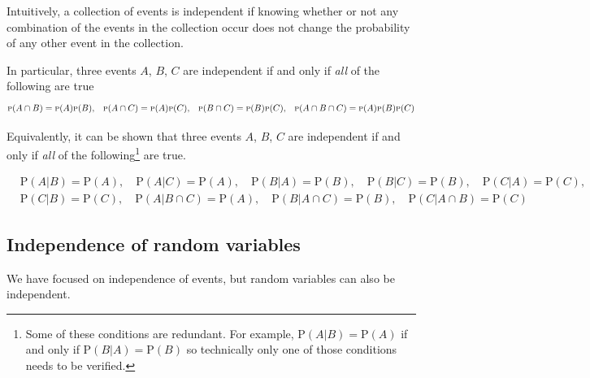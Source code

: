 \documentclass[
  letterpaper,
  DIV=11,
  numbers=noendperiod]{scrreprt}
\theoremstyle{plain}
\theoremstyle{definition}
\theoremstyle{definition}
\theoremstyle{definition}
\theoremstyle{remark}
\begin{document}
Intuitively, a collection of events is independent if knowing whether or
not any combination of the events in the collection occur does not
change the probability of any other event in the collection.

In particular, three events \(A\), \(B\), \(C\) are independent if and
only if \emph{all} of the following are true \[
\scriptsize{
\textrm{P}(A\cap B) = \textrm{P}(A)\textrm{P}(B), \quad  \textrm{P}(A\cap C) = \textrm{P}(A)\textrm{P}(C),\quad  \textrm{P}(B\cap C) = \textrm{P}(B)\textrm{P}(C),\quad \textrm{P}(A\cap B\cap C) = \textrm{P}(A)\textrm{P}(B)\textrm{P}(C)
}
\]

Equivalently, it can be shown that three events \(A\), \(B\), \(C\) are
independent if and only if \emph{all} of the following\footnote{Some of
  these conditions are redundant. For example,
  \(\textrm{P}(A|B)=\textrm{P}(A)\) if and only if
  \(\textrm{P}(B|A)=\textrm{P}(B)\) so technically only one of those
  conditions needs to be verified.} are true.

\begin{align*}
& \textrm{P}(A| B) = \textrm{P}(A), \quad \textrm{P}(A| C) = \textrm{P}(A), \quad \textrm{P}(B|A) = \textrm{P}(B), \quad \textrm{P}(B| C) = \textrm{P}(B), \quad \textrm{P}(C|A) = \textrm{P}(C),\\
& \textrm{P}(C|B) = \textrm{P}(C), \quad
\textrm{P}(A| B\cap C) = \textrm{P}(A), \quad \textrm{P}(B|A\cap C) = \textrm{P}(B), \quad \textrm{P}(C|A\cap B) = \textrm{P}(C)
\end{align*}

\subsection{Independence of random
variables}\label{independence-of-random-variables}

We have focused on independence of events, but random variables can also
be independent.
\end{document}
